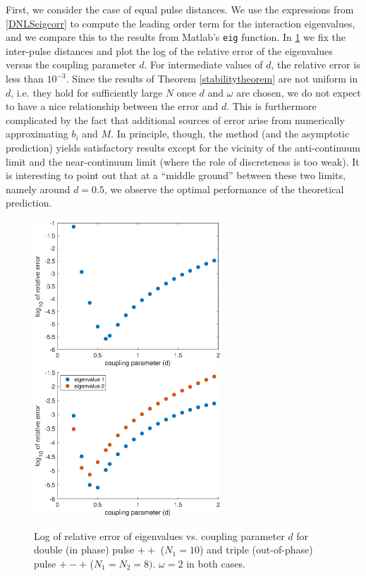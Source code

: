 \documentclass[12pt]{elsarticle}
\begin{document}
First, we consider the case of equal pulse distances. We use the expressions from \cref{DNLSeigcorr} to compute the leading order term for the interaction eigenvalues, and we compare this to the results from Matlab's \texttt{eig} function. In \cref{fig:error1} we fix the inter-pulse distances and plot the log of the relative error of the eigenvalues versus the coupling parameter $d$. For intermediate values of $d$, the relative error is less than $10^{-3}$. Since the results of Theorem \cref{stabilitytheorem} are not uniform in $d$, i.e. they hold for sufficiently large $N$ once $d$ and $\omega$ are chosen, we do not expect to have a nice relationship between the error and $d$. This is furthermore complicated by the fact that additional sources of error arise from  
numerically approximating $b_i$ and $M$. In principle, though, the method (and the asymptotic prediction) yields
satisfactory results except for the vicinity of the 
anti-continuum limit  and the near-continuum limit
(where the role of discreteness is too weak). 
It is interesting to point out that at a ``middle
ground'' between these two limits, namely around $d=0.5$,
we observe the optimal performance of the theoretical
prediction. 

\begin{figure}
\centering
\includegraphics[width=7cm]{errors1.eps}
\includegraphics[width=7cm]{errors2.eps}
\caption{Log of relative error of eigenvalues vs. coupling parameter $d$ for double (in phase) 
pulse $++$ ($N_1 = 10$) and triple (out-of-phase) pulse $+-+$ ($N_1 = N_2 = 8)$. $\omega = 2$ in both cases.}
\label{fig:error1}
\end{figure}
\end{document}
